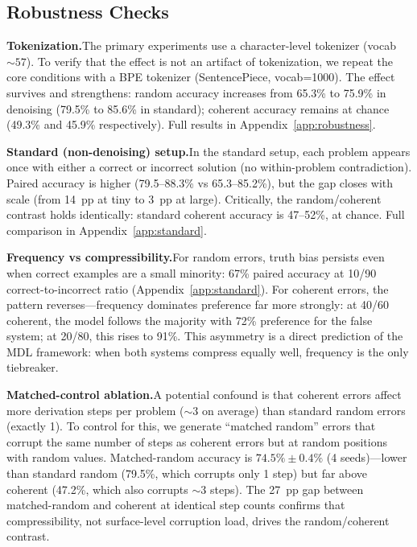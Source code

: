 \documentclass{article}
\begin{document}
\subsection{Robustness Checks}
\label{sec:robustness}

\textbf{Tokenization.}\quad The primary experiments use a character-level tokenizer (vocab ${\sim}57$). To verify that the effect is not an artifact of tokenization, we repeat the core conditions with a BPE tokenizer (SentencePiece, vocab=1000). The effect survives and strengthens: random accuracy increases from 65.3\% to 75.9\% in denoising (79.5\% to 85.6\% in standard); coherent accuracy remains at chance (49.3\% and 45.9\% respectively). Full results in Appendix~\ref{app:robustness}.

\textbf{Standard (non-denoising) setup.}\quad In the standard setup, each problem appears once with either a correct or incorrect solution (no within-problem contradiction). Paired accuracy is higher (79.5--88.3\% vs 65.3--85.2\%), but the gap closes with scale (from 14~pp at tiny to 3~pp at large). Critically, the random/coherent contrast holds identically: standard coherent accuracy is 47--52\%, at chance. Full comparison in Appendix~\ref{app:standard}.

\textbf{Frequency vs compressibility.}\quad For random errors, truth bias persists even when correct examples are a small minority: 67\% paired accuracy at 10/90 correct-to-incorrect ratio (Appendix~\ref{app:standard}). For coherent errors, the pattern reverses---frequency dominates preference far more strongly: at 40/60 coherent, the model follows the majority with 72\% preference for the false system; at 20/80, this rises to 91\%. This asymmetry is a direct prediction of the MDL framework: when both systems compress equally well, frequency is the only tiebreaker.

\textbf{Matched-control ablation.}\quad A potential confound is that coherent errors affect more derivation steps per problem (${\sim}3$ on average) than standard random errors (exactly 1). To control for this, we generate ``matched random'' errors that corrupt the same number of steps as coherent errors but at random positions with random values. Matched-random accuracy is $74.5\% \pm 0.4\%$ (4 seeds)---lower than standard random (79.5\%, which corrupts only 1 step) but far above coherent (47.2\%, which also corrupts ${\sim}3$ steps). The 27~pp gap between matched-random and coherent at identical step counts confirms that compressibility, not surface-level corruption load, drives the random/coherent contrast.
\end{document}
